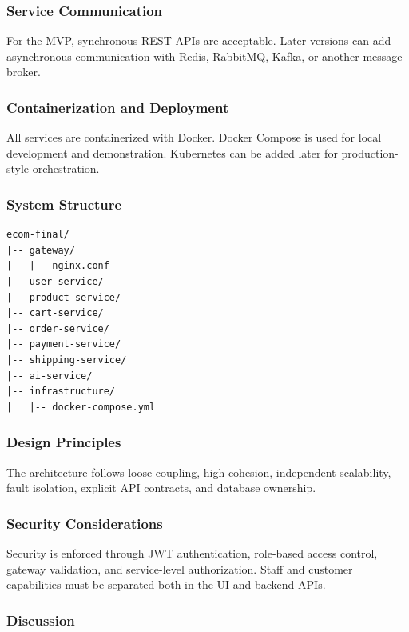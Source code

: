 \documentclass[12pt,a4paper]{article}
\begin{document}
\subsubsection{Service Communication}

For the MVP, synchronous REST APIs are acceptable. Later versions can add asynchronous communication with Redis, RabbitMQ, Kafka, or another message broker.

\subsubsection{Containerization and Deployment}

All services are containerized with Docker. Docker Compose is used for local development and demonstration. Kubernetes can be added later for production-style orchestration.

\subsubsection{System Structure}

\begin{lstlisting}[caption={Suggested project structure.}]
ecom-final/
|-- gateway/
|   |-- nginx.conf
|-- user-service/
|-- product-service/
|-- cart-service/
|-- order-service/
|-- payment-service/
|-- shipping-service/
|-- ai-service/
|-- infrastructure/
|   |-- docker-compose.yml
\end{lstlisting}

\subsubsection{Design Principles}

The architecture follows loose coupling, high cohesion, independent scalability, fault isolation, explicit API contracts, and database ownership.

\subsubsection{Security Considerations}

Security is enforced through JWT authentication, role-based access control, gateway validation, and service-level authorization. Staff and customer capabilities must be separated both in the UI and backend APIs.

\subsubsection{Discussion}
\end{document}
